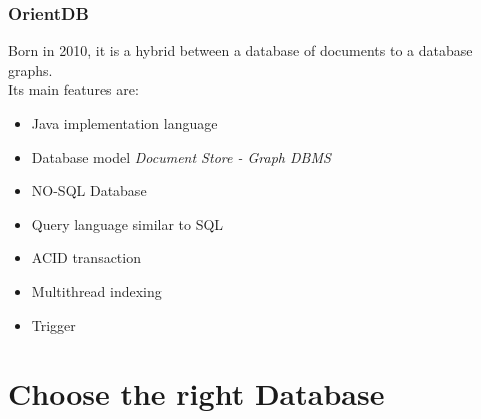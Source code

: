 \documentclass{beamer}
\begin{document}

\begin{frame}
\frametitle{OrientDB}
Born in 2010, it is a hybrid between a database of documents to a database graphs. \\
Its main features are:
\begin{itemize}
\item Java implementation language
\item Database model \emph{Document Store - Graph DBMS}
\item NO-SQL Database  
\item Query language similar to SQL
\item ACID transaction
\item Multithread indexing
\item Trigger
\end{itemize}
\end{frame}

\section{Choose the right Database}
\end{document}
